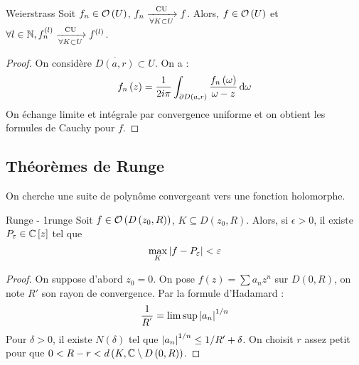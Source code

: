 \documentclass{cours}
\begin{document}
\begin{théorème}{Weierstrass}{}
    Soit $f_{n} \in \mathcal{O}\left(U\right)$, $f_{n} \xrightarrow[\forall K \subset U]{\rm CU} f$. Alors, $f \in \mathcal{O}\left(U\right)$ et $\forall l \in \mathbb{N}, f_{n}^{\left(l\right)} \xrightarrow[\forall K \subset U]{\rm CU} f^{\left(l\right)}$.
\end{théorème}
\begin{proof}
    On considère $\overline{D\left(a, r\right)}\subset U$. On a : 
    \begin{equation*}
        f_{n}\left(z\right) = \frac{1}{2i\pi}\int_{\partial D\left(a, r\right)}\frac{f_{n}\left(\omega\right)}{\omega - z}{\rm \, d} \omega
    \end{equation*}
    On échange limite et intégrale par convergence uniforme et on obtient les formules de Cauchy pour $f$. 
\end{proof}

\subsection{Théorèmes de Runge}
On cherche une suite de polynôme convergeant vers une fonction holomorphe.
\begin{théorème}{Runge - 1}{runge}
    Soit $f \in \mathcal{O}\left(D\left(z_{0}, R\right)\right)$, $K \subseteq D\left(z_{0}, R\right)$. Alors, si $\epsilon > 0$, il existe $P_{\varepsilon} \in \mathbb{C}\left[z\right]$ tel que 
    \begin{equation*}
       \max_{K}\left|f - P_{\varepsilon}\right| < \varepsilon
    \end{equation*} 
\end{théorème}
\begin{proof}
    On suppose d'abord $z_{0} = 0$. On pose $f\left(z\right) = \sum a_{n}z^{n}$ sur $D\left(0, R\right)$, on note $R'$ son rayon de convergence. Par la formule d'Hadamard : 
    \begin{equation*}
        \frac{1}{R^{'}} = \limsup \left|a_{n}\right|^{1/n}
    \end{equation*}
    Pour $\delta > 0$, il existe $N\left(\delta\right)$ tel que $\left|a_{n}\right|^{1/n} \leq 1/R' + \delta$. On choisit $r$ assez petit pour que $0 < R - r < d\left(K, \mathbb{C} \setminus D\left(0, R\right)\right)$.
\end{proof}
\end{document}
